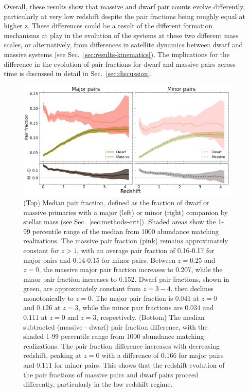 \documentclass[twocolumn]{aastex631}
\begin{document}
Overall, these results show that massive and dwarf pair counts evolve differently, particularly at very low redshift despite the pair fractions being roughly equal at higher z. 
These differences could be a result of the different formation mechanisms at play in the evolution of the systems at these two different mass scales, or alternatively, from differences in satellite dynamics between dwarf and massive systems (see Sec.~\ref{sec:results-kinematics}). 
The implications for the difference in the evolution of pair fractions for dwarf and massive pairs across time is discussed in detail in Sec.~\ref{sec:discussion}.

\label{sec:results}
\begin{figure}[htp]
  \centering
  \includegraphics[width=\textwidth]{pairfrac_1000.png}
  \caption{
    (Top) Median pair fraction, defined as the fraction of dwarf or massive primaries with a major (left) or minor (right) companion by stellar mass (see Sec.~\ref{sec:methods-crit}). 
    Shaded areas show the 1-99 percentile range of the median from 1000 abundance matching realizations. 
    The massive pair fraction (pink) remains approximately constant for $z>1$, with an average pair fraction of 0.16-0.17 for major pairs and 0.14-0.15 for minor pairs. Between $z=0.25$ and $z=0$, the massive major pair fraction increases to 0.207, while the minor pair fraction increases to 0.152.
    Dwarf pair fractions, shown in green, are approximately constant from $z=3-4$, then declines monotonically to $z=0$. The major pair fraction is $0.041$ at $z=0$ and $0.126$ at $z=3$, while the minor pair fractions are $0.034$ and $0.111$ at $z=0$ and $z=3$, respectively. 
    (Bottom) The median subtracted (massive - dwarf) pair fraction difference, with the shaded $1$-$99$ percentile range from 1000 abundance matching realizations. The pair fraction difference increases with decreasing redshift, peaking at $z=0$ with a difference of 0.166 for major pairs and 0.111 for minor pairs. This shows that the redshift evolution of the pair fractions of massive pairs and dwarf pairs proceed differently, particularly in the low redshift regime.}
  \label{fig:pairratio}
\end{figure}
\end{document}
